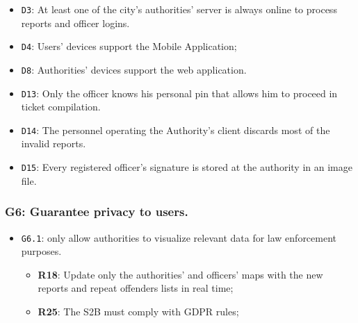 \documentclass[12pt,a4paper]{article}
\begin{document}
	\begin{itemize}
			\item \texttt{D3}: At least one of the city's authorities' server is always online to process reports and officer logins.
			\item \texttt{D4}: Users' devices support the Mobile Application;
			\item \texttt{D8}: Authorities' devices support the web application.
			\item \texttt{D13}: Only the officer knows his personal pin that allows him to proceed in ticket compilation.
			\item \texttt{D14}: The personnel operating the Authority's client discards most of the invalid reports.
			\item \texttt{D15}: Every registered officer's signature is stored at the authority in an image file.
	\end{itemize}

\subsubsection{G6: Guarantee privacy to users.}
	
	\begin{itemize}
	\item \texttt{G6.1}: only allow authorities to visualize relevant data for law enforcement purposes.
							\begin{itemize}
									\item \textbf{R18}: Update only the authorities' and officers' maps with the new reports and repeat offenders lists in real time;
									\item \textbf{R25}: The S2B must comply with GDPR rules;
							\end{itemize}
	\end{itemize}

\newpage
\end{document}
